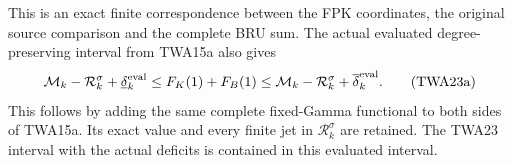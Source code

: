 This is an exact finite correspondence between the FPK coordinates,
the original source comparison and the complete BRU sum. The actual
evaluated degree-preserving interval from TWA15a also gives
\[
 \mathcal M_k-\mathcal R_k^\sigma+\underline\delta_k^{\rm eval}
 \leq F_K(1)+F_B(1)
 \leq\mathcal M_k-\mathcal R_k^\sigma+\overline\delta_k^{\rm eval}.
 \tag{TWA23a}
\]
This follows by adding the same complete fixed-Gamma functional
to both sides of TWA15a. Its exact value and every finite jet
in $\mathcal R_k^\sigma$ are retained. The TWA23 interval with
the actual deficits is contained in this evaluated interval.